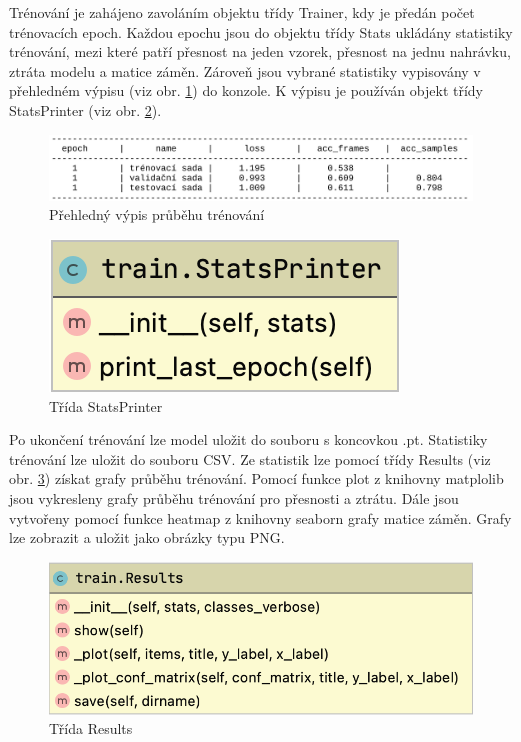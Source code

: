 \documentclass[FM,BP]{tulthesis}
\begin{document}
Trénování je zahájeno zavoláním objektu třídy Trainer, kdy je předán počet trénovacích epoch. Každou epochu jsou do objektu třídy Stats ukládány statistiky trénování, mezi které patří přesnost na jeden vzorek, přesnost na jednu nahrávku, ztráta modelu a matice záměn. Zároveň jsou vybrané statistiky vypisovány v přehledném výpisu (viz obr. \mbox{\ref{fig:print}}) do konzole. K výpisu je používán objekt třídy StatsPrinter (viz obr. \mbox{\ref{fig:printer}}).

\begin{figure}[ht]
\centerline{\includegraphics[scale=.215]{train_log.png}}
\caption{Přehledný výpis průběhu trénování}
\label{fig:print}
\end{figure}
\FloatBarrier

\begin{figure}[ht]
\centerline{\includegraphics[scale=.32]{train-stats_printer.png}}
\caption{Třída StatsPrinter}
\label{fig:printer}
\end{figure}
\FloatBarrier

Po ukončení trénování lze model uložit do souboru s koncovkou .pt. Statistiky trénování lze uložit do souboru CSV. Ze statistik lze pomocí třídy Results (viz obr. \mbox{\ref{fig:results}}) získat grafy průběhu trénování. Pomocí funkce plot z knihovny matplolib jsou vykresleny grafy průběhu trénování pro přesnosti a ztrátu. Dále jsou vytvořeny pomocí funkce heatmap z knihovny seaborn grafy matice záměn. Grafy lze zobrazit a uložit jako obrázky typu PNG.

\begin{figure}[ht]
\centerline{\includegraphics[scale=.3]{train-results.png}}
\caption{Třída Results}
\label{fig:results}
\end{figure}
\FloatBarrier
\end{document}
